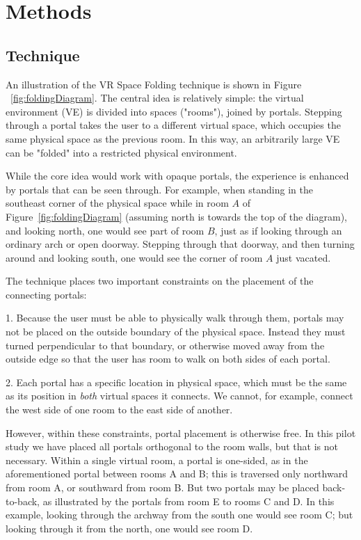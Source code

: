 \documentclass{sigchi}
\begin{document}
\section{Methods}

\subsection{Technique}

An illustration of the VR Space Folding technique is shown in Figure ~\ref{fig:foldingDiagram}.  The central idea is relatively simple: the virtual environment (VE) is divided into spaces ("rooms"), joined by portals.  Stepping through a portal takes the user to a different virtual space, which occupies the same physical space as the previous room.  In this way, an arbitrarily large VE can be "folded" into a restricted physical environment.

While the core idea would work with opaque portals, the experience is enhanced by portals that can be seen through.  For example, when standing in the southeast corner of the physical space while in room $A$ of Figure~\ref{fig:foldingDiagram} (assuming north is towards the top of the diagram), and looking north, one would see part of room $B$, just as if looking through an ordinary arch or open doorway.  Stepping through that doorway, and then turning around and looking south, one would see the corner of room $A$ just vacated.

The technique places two important constraints on the placement of the connecting portals:

1. Because the user must be able to physically walk through them, portals may not be placed on the outside boundary of the physical space.  Instead they must turned perpendicular to that boundary, or otherwise moved away from the outside edge so that the user has room to walk on both sides of each portal.

2. Each portal has a specific location in physical space, which must be the same as its position in \textit{both} virtual spaces it connects.  We cannot, for example, connect the west side of one room to the east side of another.

However, within these constraints, portal placement is otherwise free.  In this pilot study we have placed all portals orthogonal to the room walls, but that is not necessary.  Within a single virtual room, a portal is one-sided, as in the aforementioned portal between rooms A and B; this is traversed only northward from room A, or southward from room B.  But two portals may be placed back-to-back, as illustrated by the portals from room E to rooms C and D.  In this example, looking through the archway from the south one would see room C; but looking through it from the north, one would see room D.
\end{document}
